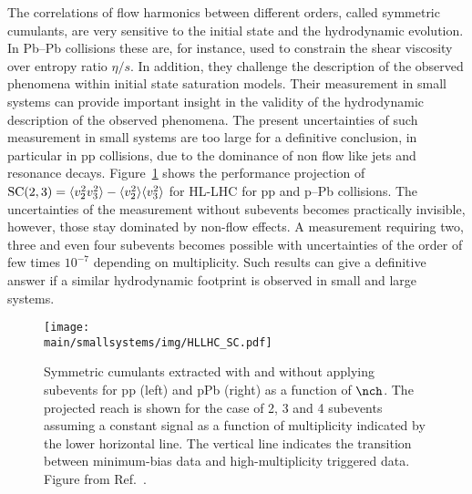 \documentclass[../report.tex]{subfiles}
\providecommand{\main}{..}
\begin{document}

The correlations of flow harmonics between different orders, called symmetric cumulants, are very sensitive to the initial state and the hydrodynamic evolution. In Pb--Pb collisions these are, for instance, used to constrain the shear viscosity over entropy ratio $\eta/s$. In addition, they challenge the description of the observed phenomena within initial state saturation models.
Their measurement in small systems can provide important insight in the validity of the hydrodynamic description of the observed phenomena. The present uncertainties of such measurement in small systems are too large for a definitive conclusion, in particular in pp collisions, due to the dominance of non flow like jets and resonance decays. Figure~\ref{fig:smallsystems_corr_symmetriccumulants} shows the performance projection of ${\rm SC}(2,3) = \langle v_2^2 v_3^2 \rangle - \langle v_2^2 \rangle \langle v_3^2 \rangle$ for HL-LHC for pp and p--Pb collisions. The uncertainties of the measurement without subevents becomes practically invisible, however, those stay dominated by non-flow effects. A measurement requiring two, three and even four subevents becomes possible with uncertainties of the order of few times $10^{-7}$ depending on multiplicity. Such results can give a definitive answer if a similar hydrodynamic footprint is observed in small and large systems.

\begin{figure}[t]
\centering
\texttt{[image: \\main/smallsystems/img/HLLHC\_SC.pdf]}
\caption{Symmetric cumulants extracted with and without applying subevents for pp (left) and pPb (right) as a function of $\nch$. The projected reach is shown for the case of 2, 3 and 4 subevents assuming a constant signal as a function of multiplicity indicated by the lower horizontal line. The vertical line indicates the transition between minimum-bias data and high-multiplicity triggered data. Figure from Ref.~\cite{}.}
\label{fig:smallsystems_corr_symmetriccumulants}
\end{figure}
\end{document}
